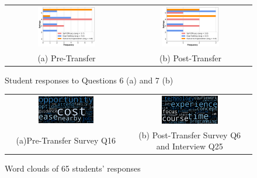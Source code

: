 \documentclass{article}
\begin{document}
\vspace{-5pt}
\begin{figure}[h]
\centering
\begin{tabular}{cc}
\includegraphics[width=0.49\textwidth]{Q6.png} & \includegraphics[width=0.49\textwidth]{Q7.png} \\
   {\footnotesize (a) Pre-Transfer} & {\footnotesize (b) Post-Transfer}\\ 
    \end{tabular}
    \vspace{-5pt}
     \caption{Student responses to Questions 6 (a) and 7 (b)}
    \label{fig:q3a}
\end{figure}

\begin{figure}[h]
\centering
\begin{tabular}{cc}
\includegraphics[width=0.48\textwidth]{Survey_Q16.png} & \includegraphics[width=0.48\textwidth]{Survey_Inter_Q6_25.png} \\

   {\footnotesize (a)Pre-Transfer Survey Q16} & {\footnotesize (b) Post-Transfer Survey Q6 and Interview Q25}\\ 
    \end{tabular}
    \vspace{-5pt}
     \caption{Word clouds of  65 students’ responses}
\label{fig:q3b}
\end{figure}
\end{document}
